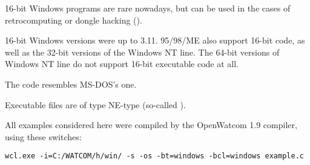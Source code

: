
16-bit Windows programs are rare nowadays, but can be used in the cases of retrocomputing
or dongle hacking ().

16-bit Windows versions were up to 3.11.
95/98/ME also support 16-bit code, as well as the 32-bit versions of the \gls{Windows NT} line.
The 64-bit versions of \gls{Windows NT} line do not support 16-bit executable code at all.

The code resembles MS-DOS's one.

Executable files are of type NE-type (so-called ).

All examples considered here were compiled by the OpenWatcom 1.9 compiler, using these switches:

\begin{lstlisting}
wcl.exe -i=C:/WATCOM/h/win/ -s -os -bt=windows -bcl=windows example.c
\end{lstlisting}








